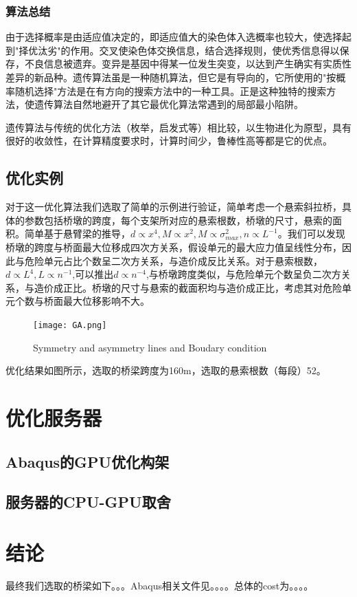 \documentclass[forprint]{WHUBachelor}
\begin{document}
\subsection{算法总结}
由于选择概率是由适应值决定的，即适应值大的染色体入选概率也较大，使选择起到"择优汰劣"的作用。交叉使染色体交换信息，结合选择规则，使优秀信息得以保存，不良信息被遗弃。变异是基因中得某一位发生突变，以达到产生确实有实质性差异的新品种。遗传算法虽是一种随机算法，但它是有导向的，它所使用的"按概率随机选择"方法是在有方向的搜索方法中的一种工具。正是这种独特的搜索方法，使遗传算法自然地避开了其它最优化算法常遇到的局部最小陷阱。\par
遗传算法与传统的优化方法（枚举，启发式等）相比较，以生物进化为原型，具有很好的收敛性，在计算精度要求时，计算时间少，鲁棒性高等都是它的优点。
\section{优化实例}
对于这一优化算法我们选取了简单的示例进行验证，简单考虑一个悬索斜拉桥，具体的参数包括桥墩的跨度，每个支架所对应的悬索根数，桥墩的尺寸，悬索的面积。简单基于悬臂梁的推导，$d\propto x^4,M\propto x^2,M\propto \sigma_{max}^2,n \propto L^{-1}$。我们可以发现桥墩的跨度与桥面最大位移成四次方关系，假设单元的最大应力值呈线性分布，因此与危险单元占比个数呈二次方关系，与造价成反比关系。对于悬索根数，$d \propto L^4,L \propto n^{-1}$,可以推出$d \propto n^{-4}$,与桥墩跨度类似，与危险单元个数呈负二次方关系，与造价成正比。桥墩的尺寸与悬索的截面积均与造价成正比，考虑其对危险单元个数与桥面最大位移影响不大。
\begin{figure}[H]
\centering
    \texttt{[image: GA.png]}\hfill
  \caption{Symmetry and asymmetry lines and Boudary condition}
\label{fig:1}
\end{figure}
优化结果如图所示，选取的桥梁跨度为160m，选取的悬索根数（每段）52。
\chapter{优化服务器}
\section{Abaqus的GPU优化构架}
\section{服务器的CPU-GPU取舍}
\chapter{结论}
最终我们选取的桥梁如下。。。Abaqus相关文件见。。。。总体的cost为。。。。


\cleardoublepage
\end{document}
